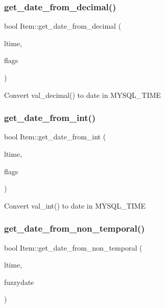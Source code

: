 \subsubsection{\texorpdfstring{get\+\_\+date\+\_\+from\+\_\+decimal()}{get\_date\_from\_decimal()}}
{\footnotesize\ttfamily bool Item\+::get\+\_\+date\+\_\+from\+\_\+decimal (\begin{DoxyParamCaption}\item[{M\+Y\+S\+Q\+L\+\_\+\+T\+I\+ME $\ast$}]{ltime,  }\item[{my\+\_\+time\+\_\+flags\+\_\+t}]{flags }\end{DoxyParamCaption})\hspace{0.3cm}{\ttfamily [protected]}}

Convert val\+\_\+decimal() to date in M\+Y\+S\+Q\+L\+\_\+\+T\+I\+ME \mbox{\label{classItem_ada63b68c953a82ca7f2f7cdc851ae755}} 
\subsubsection{\texorpdfstring{get\+\_\+date\+\_\+from\+\_\+int()}{get\_date\_from\_int()}}
{\footnotesize\ttfamily bool Item\+::get\+\_\+date\+\_\+from\+\_\+int (\begin{DoxyParamCaption}\item[{M\+Y\+S\+Q\+L\+\_\+\+T\+I\+ME $\ast$}]{ltime,  }\item[{my\+\_\+time\+\_\+flags\+\_\+t}]{flags }\end{DoxyParamCaption})\hspace{0.3cm}{\ttfamily [protected]}}

Convert val\+\_\+int() to date in M\+Y\+S\+Q\+L\+\_\+\+T\+I\+ME \mbox{\label{classItem_ac58bafe79e54dca5453a67b95e975a5e}} 
\subsubsection{\texorpdfstring{get\+\_\+date\+\_\+from\+\_\+non\+\_\+temporal()}{get\_date\_from\_non\_temporal()}}
{\footnotesize\ttfamily bool Item\+::get\+\_\+date\+\_\+from\+\_\+non\+\_\+temporal (\begin{DoxyParamCaption}\item[{M\+Y\+S\+Q\+L\+\_\+\+T\+I\+ME $\ast$}]{ltime,  }\item[{my\+\_\+time\+\_\+flags\+\_\+t}]{fuzzydate }\end{DoxyParamCaption})\hspace{0.3cm}{\ttfamily [protected]}}

